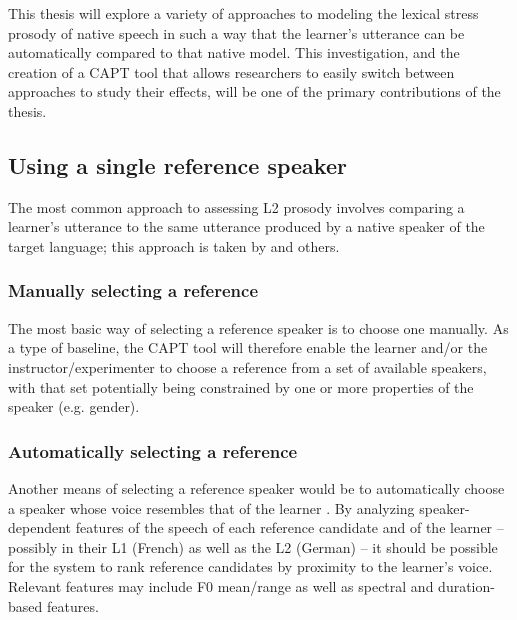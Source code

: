 	This thesis will explore a variety of approaches to modeling the lexical stress prosody of native speech in such a way that the learner's utterance can be automatically compared to that native model. This investigation, and the creation of a CAPT tool that allows researchers to easily switch between approaches to study their effects, will be one of the primary contributions of the thesis.
	
	\subsection{Using a single reference speaker}
	\label{sec:compare:single}
	
	The most common approach to assessing L2 prosody involves comparing a learner's utterance to the same utterance produced by a native speaker of the target language; this approach is taken by \textcite{Bonneau2011} and others.%
	
		\subsubsection{Manually selecting a reference}
		\label{sec:compare:single:manual}
		
		The most basic way of selecting a reference speaker is to choose one manually.
As a type of baseline, the CAPT tool will therefore enable the learner and/or the instructor/experimenter to choose a reference from a set of available speakers, with that set potentially being constrained by one or more properties of the speaker (e.g. gender). 
	
		\subsubsection{Automatically selecting a reference}
		\label{sec:compare:single:auto}
		
		Another means of selecting a reference speaker would be to automatically choose a speaker whose voice resembles
that of the learner \citep{Probst2002}. By analyzing speaker-dependent features of the speech of each reference candidate and of the learner -- possibly in their L1 (French) as well as the L2 (German) -- it should be possible for the system to rank reference candidates by proximity to the learner's voice. Relevant features may include F0 mean/range as well as spectral and duration-based features.
	
